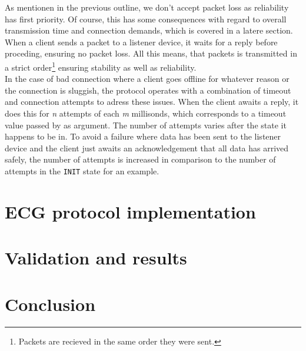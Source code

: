 \documentclass{article}
\newcommand{\code}[1]{\texttt{#1}}
\begin{document}
{		As mentionen in the previous outline, we don't accept packet loss as reliability has first priority. Of course, this has some consequences with regard to overall transmission time and connection demands, which is covered in a latere section. When a client sends a packet to a listener device, it waits for a reply before proceding, ensuring no packet loss. All this means, that packets is transmitted in a strict order\footnote{Packets are recieved in the same order they were sent.} ensuring stability as well as reliability.\\
		
		In the case of bad connection where a client goes offline for whatever reason or the connection is sluggish, the protocol operates with a combination of timeout and connection attempts to adress these issues. When the client awaits a reply, it does this for \textit{n} attempts of each \textit{m} millisonds, which corresponds to a timeout value passed by as argument. The number of attempts varies after the state it happens to be in. To avoid a failure where data has been sent to the listener device and the client just awaits an acknowledgement that all data has arrived safely, the number of attempts is increased in comparison to the number of attempts in the \code{INIT} state for an example.
		}
	
	\section{ECG protocol implementation}
	\section{Validation and results}
	\section{Conclusion}
	
	\pagebreak
	
	
	
	
	
		
\end{document}
